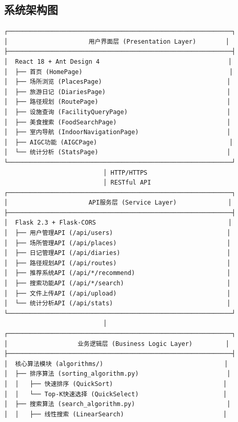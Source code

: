 \documentclass[12pt,a4paper]{article}
\begin{document}
\subsection{系统架构图}
\begin{verbatim}
┌─────────────────────────────────────────────────────────────┐
│                      用户界面层 (Presentation Layer)        │
├─────────────────────────────────────────────────────────────┤
│  React 18 + Ant Design 4                                   │
│  ├── 首页 (HomePage)                                        │
│  ├── 场所浏览 (PlacesPage)                                  │
│  ├── 旅游日记 (DiariesPage)                                 │
│  ├── 路径规划 (RoutePage)                                   │
│  ├── 设施查询 (FacilityQueryPage)                           │
│  ├── 美食搜索 (FoodSearchPage)                              │
│  ├── 室内导航 (IndoorNavigationPage)                        │
│  ├── AIGC功能 (AIGCPage)                                    │
│  └── 统计分析 (StatsPage)                                   │
└─────────────────────────────────────────────────────────────┘
                           │ HTTP/HTTPS
                           │ RESTful API
┌─────────────────────────────────────────────────────────────┐
│                      API服务层 (Service Layer)              │
├─────────────────────────────────────────────────────────────┤
│  Flask 2.3 + Flask-CORS                                    │
│  ├── 用户管理API (/api/users)                               │
│  ├── 场所管理API (/api/places)                              │
│  ├── 日记管理API (/api/diaries)                             │
│  ├── 路径规划API (/api/routes)                              │
│  ├── 推荐系统API (/api/*/recommend)                         │
│  ├── 搜索功能API (/api/*/search)                            │
│  ├── 文件上传API (/api/upload)                              │
│  └── 统计分析API (/api/stats)                               │
└─────────────────────────────────────────────────────────────┘
                           │
┌─────────────────────────────────────────────────────────────┐
│                   业务逻辑层 (Business Logic Layer)         │
├─────────────────────────────────────────────────────────────┤
│  核心算法模块 (algorithms/)                                 │
│  ├── 排序算法 (sorting_algorithm.py)                        │
│  │   ├── 快速排序 (QuickSort)                              │
│  │   └── Top-K快速选择 (QuickSelect)                       │
│  ├── 搜索算法 (search_algorithm.py)                         │
│  │   ├── 线性搜索 (LinearSearch)                           │

\end{verbatim}
\end{document}
